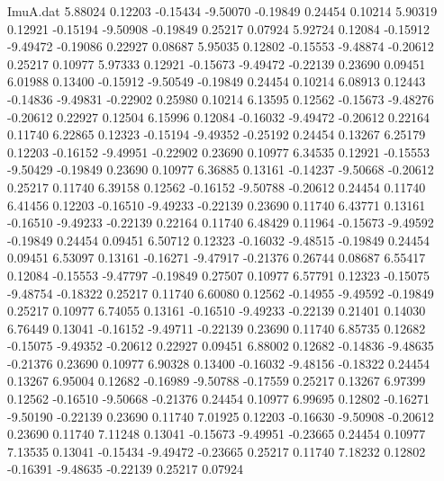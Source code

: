 \begin{filecontents}{ImuA.dat}
   5.88024    0.12203   -0.15434   -9.50070   -0.19849    0.24454    0.10214
   5.90319    0.12921   -0.15194   -9.50908   -0.19849    0.25217    0.07924
   5.92724    0.12084   -0.15912   -9.49472   -0.19086    0.22927    0.08687
   5.95035    0.12802   -0.15553   -9.48874   -0.20612    0.25217    0.10977
   5.97333    0.12921   -0.15673   -9.49472   -0.22139    0.23690    0.09451
   6.01988    0.13400   -0.15912   -9.50549   -0.19849    0.24454    0.10214
   6.08913    0.12443   -0.14836   -9.49831   -0.22902    0.25980    0.10214
   6.13595    0.12562   -0.15673   -9.48276   -0.20612    0.22927    0.12504
   6.15996    0.12084   -0.16032   -9.49472   -0.20612    0.22164    0.11740
   6.22865    0.12323   -0.15194   -9.49352   -0.25192    0.24454    0.13267
   6.25179    0.12203   -0.16152   -9.49951   -0.22902    0.23690    0.10977
   6.34535    0.12921   -0.15553   -9.50429   -0.19849    0.23690    0.10977
   6.36885    0.13161   -0.14237   -9.50668   -0.20612    0.25217    0.11740
   6.39158    0.12562   -0.16152   -9.50788   -0.20612    0.24454    0.11740
   6.41456    0.12203   -0.16510   -9.49233   -0.22139    0.23690    0.11740
   6.43771    0.13161   -0.16510   -9.49233   -0.22139    0.22164    0.11740
   6.48429    0.11964   -0.15673   -9.49592   -0.19849    0.24454    0.09451
   6.50712    0.12323   -0.16032   -9.48515   -0.19849    0.24454    0.09451
   6.53097    0.13161   -0.16271   -9.47917   -0.21376    0.26744    0.08687
   6.55417    0.12084   -0.15553   -9.47797   -0.19849    0.27507    0.10977
   6.57791    0.12323   -0.15075   -9.48754   -0.18322    0.25217    0.11740
   6.60080    0.12562   -0.14955   -9.49592   -0.19849    0.25217    0.10977
   6.74055    0.13161   -0.16510   -9.49233   -0.22139    0.21401    0.14030
   6.76449    0.13041   -0.16152   -9.49711   -0.22139    0.23690    0.11740
   6.85735    0.12682   -0.15075   -9.49352   -0.20612    0.22927    0.09451
   6.88002    0.12682   -0.14836   -9.48635   -0.21376    0.23690    0.10977
   6.90328    0.13400   -0.16032   -9.48156   -0.18322    0.24454    0.13267
   6.95004    0.12682   -0.16989   -9.50788   -0.17559    0.25217    0.13267
   6.97399    0.12562   -0.16510   -9.50668   -0.21376    0.24454    0.10977
   6.99695    0.12802   -0.16271   -9.50190   -0.22139    0.23690    0.11740
   7.01925    0.12203   -0.16630   -9.50908   -0.20612    0.23690    0.11740
   7.11248    0.13041   -0.15673   -9.49951   -0.23665    0.24454    0.10977
   7.13535    0.13041   -0.15434   -9.49472   -0.23665    0.25217    0.11740
   7.18232    0.12802   -0.16391   -9.48635   -0.22139    0.25217    0.07924

\end{filecontents}
